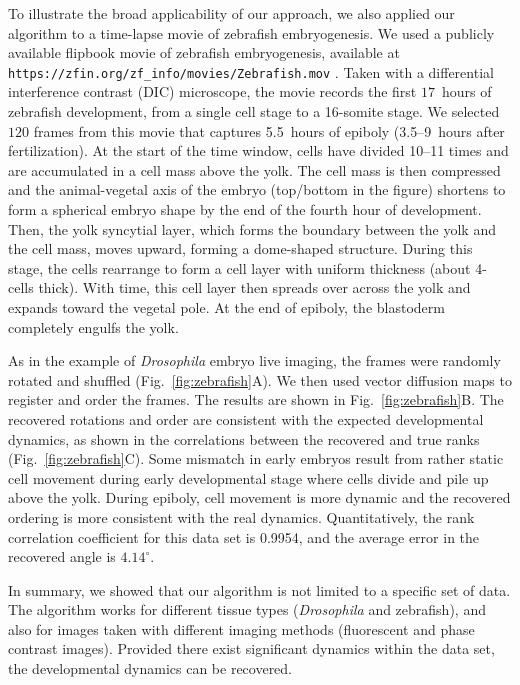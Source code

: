 \documentclass[twocolumn, 10pt]{article}
\newcommand{\fig}[0]{Fig.}
\begin{document}
To illustrate the broad applicability of our approach, we also applied our algorithm to a time-lapse movie  of zebrafish embryogenesis. 
%
We used a publicly available flipbook movie of zebrafish embryogenesis, available at \texttt{https://zfin.org/zf\_info/movies/Zebrafish.mov} \cite{karlstrom1996flipbook}.  
%
Taken with a differential interference contrast (DIC) microscope, the movie records the first $17$~hours of zebrafish development, from a single cell stage to a 16-somite stage. 
%
We selected $120$ frames from this movie that captures 5.5~hours of epiboly (3.5--9~hours after fertilization). 
%
At the start of the time window, cells have divided 10--11 times and are accumulated in a cell mass above the yolk. 
%
The cell mass is then compressed and the animal-vegetal axis of the embryo (top/bottom in the figure) shortens to form a spherical embryo shape by the end of the fourth hour of development. 
%
Then, the yolk syncytial layer, which forms the boundary between the yolk and the cell mass, moves upward, forming a dome-shaped structure.  
%
During this stage, the cells rearrange to form a cell layer with uniform thickness (about 4-cells thick). 
%
With time, this cell layer then spreads over across the yolk and expands toward the vegetal pole. 
%
At the end of epiboly, the blastoderm completely engulfs the yolk. 

As in the example of {\em Drosophila} embryo live imaging, the frames were randomly rotated and shuffled (\fig~\ref{fig:zebrafish}A). 
%
We then used vector diffusion maps to register and order the frames. 
%
The results are shown in \fig~\ref{fig:zebrafish}B. 
%
The recovered rotations and order are consistent with the expected developmental dynamics, as shown in the correlations between the recovered and true ranks (\fig~\ref{fig:zebrafish}C). 
%
Some mismatch in early embryos result from rather static cell movement during early developmental stage where cells divide and pile up above the yolk. 
%
During epiboly, cell movement is more dynamic and the recovered ordering is more consistent with the real dynamics.
%
Quantitatively, the rank correlation coefficient for this data set is 0.9954, and the average error in the recovered angle is $4.14^\circ$. 

In summary, we showed that our algorithm is not limited to a specific set of data. 
%
The algorithm works for different tissue types ({\em Drosophila} and zebrafish), and also for images taken with different imaging methods (fluorescent and phase contrast images).
%
Provided there exist significant dynamics within the data set, the developmental dynamics can be recovered.
\end{document}
